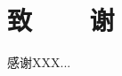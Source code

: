 \renewcommand{\baselinestretch}{1.5}
\fontsize{12pt}{13pt}\selectfont
{}
\chapter*{致~~~~谢}


感谢XXX...

\cleardoublepage
\endinput